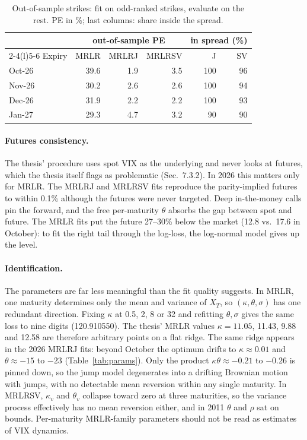 \documentclass[10pt,twocolumn]{article}
\begin{document}
\begin{table}[t]
\centering\small
\caption{Out-of-sample strikes: fit on odd-ranked strikes, evaluate on the rest.
PE in \%; last columns: share inside the spread.}
\label{tab:oos}
\setlength{\tabcolsep}{4pt}
\begin{tabular}{@{}l rrr rr@{}}
\toprule
 & \multicolumn{3}{c}{out-of-sample PE} & \multicolumn{2}{c}{in spread (\%)}\\
\cmidrule(lr){2-4}\cmidrule(l){5-6}
Expiry & MRLR & MRLRJ & MRLRSV & J & SV\\
\midrule
Oct-26 & 39.6 & 1.9 & 3.5 & 100 & 96\\
Nov-26 & 30.2 & 2.6 & 2.6 & 100 & 94\\
Dec-26 & 31.9 & 2.2 & 2.2 & 100 & 93\\
Jan-27 & 29.3 & 4.7 & 3.2 & 90 & 90\\
\bottomrule
\end{tabular}
\end{table}

\paragraph{Futures consistency.} The thesis' procedure uses spot VIX as the underlying
and never looks at futures, which the thesis itself flags as problematic (Sec.~7.3.2). In 2026
this matters only for MRLR. The MRLRJ and MRLRSV fits reproduce the parity-implied
futures to within 0.1\% although the futures were never targeted. Deep in-the-money
calls pin the forward, and the free per-maturity $\theta$ absorbs the gap between spot
and future. The MRLR fits put the future 27--30\% below the market (12.8 vs.\ 17.6 in
October): to fit the right tail through the log-loss, the log-normal model gives up
the level.

\paragraph{Identification.} The parameters are far less meaningful than the fit quality
suggests. In MRLR, one maturity determines only the mean and variance of $X_T$, so
$(\kappa,\theta,\sigma)$ has one redundant direction. Fixing $\kappa$ at 0.5, 2, 8 or
32 and refitting $\theta,\sigma$ gives the same loss to nine digits (120.910550). The
thesis' MRLR values $\kappa=11.05$, 11.43, 9.88 and 12.58 are therefore arbitrary
points on a flat ridge. The same ridge appears in the 2026 MRLRJ fits: beyond
October the optimum drifts to $\kappa\approx0.01$ and $\theta\approx-15$ to $-23$
(Table~\ref{tab:params}). Only the product $\kappa\theta\approx-0.21$ to $-0.26$ is
pinned down, so the jump model degenerates into a drifting Brownian motion with jumps,
with no detectable mean reversion within any single maturity. In MRLRSV, $\kappa_v$ and
$\theta_v$ collapse toward zero at three maturities, so the variance process
effectively has no mean reversion either, and in 2011 $\theta$ and $\rho$ sat on
bounds. Per-maturity MRLR-family parameters should not be read as
estimates of VIX dynamics.
\end{document}
